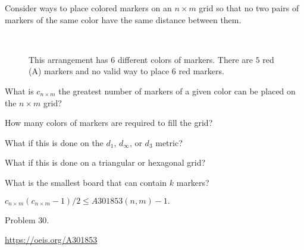 \documentclass{article}
\begin{document}
Consider ways to place colored markers on an $n \times m$ grid so that no two
pairs of markers of the same color have the same distance between them.

\begin{figure}[!h]
  \centering
  \\
  \caption{
    This arrangement has $6$ different colors of markers.
    There are $5$ red (A) markers and no valid way to place $6$ red markers.
  }
\end{figure}

\begin{question}
  What is $c_{n \times m}$ the greatest number of markers of a given color can
  be placed on the $n \times m$ grid?
\end{question}
\begin{related}
  \item How many colors of markers are required to fill the grid?
  \item What if this is done on the $d_1$, $d_\infty$, or $d_3$ metric?
  \item What if this is done on a triangular or hexagonal grid?
  \item What is the smallest board that can contain $k$ markers?
\end{related}
\begin{note}
  $c_{n \times m}(c_{n \times m}-1)/2 \leq A301853(n, m) - 1.$
\end{note}
\begin{references}
  \item Problem 30.
  \item \url{https://oeis.org/A301853}
\end{references}
\end{document}
